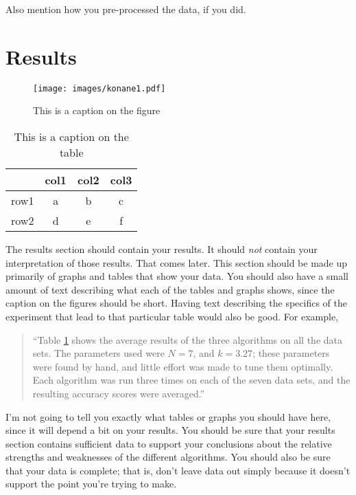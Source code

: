 \documentclass[12pt, letterpaper]{article}
\begin{document}
Also mention how you pre-processed the data, if you did.


\section{Results}
\begin{figure}
\begin{center}
\texttt{[image: images/konane1.pdf]}
\end{center}
\caption{This is a caption on the figure}
\label{somefigure}
\end{figure}

\begin{table}
\begin{center}
\begin{tabular}{|c||c|cc}
\hline
& col1 & col2 & col3\\
\hline \hline
row1 & a & b & c\\
\hline 
row2 & d & e & f\\
\hline 
\end{tabular}
\end{center}
\caption{This is a caption on the table}
\label{sometable}
\end{table}

The results section should contain your results.  It should \emph{not} contain
your interpretation of those results.  That comes later.  This section should be
made up primarily of graphs and tables that show your data.  You should also
have a small amount of text describing what each of the tables and graphs shows,
since the caption on the figures should be short.  Having text describing the
specifics of the experiment that lead to that particular table would also be
good.  For example,

\begin{quote}
``Table \ref{sometable} shows the average results of the three algorithms on all
the data sets.  The parameters used were $N=7$, and $k=3.27$; these parameters
were found by hand, and little effort was made to tune them optimally.  Each
algorithm was run three times on each of the seven data sets, and the resulting
accuracy scores were averaged.''
\end{quote}

I'm not going to tell you exactly what tables or graphs you should have here,
since it will depend a bit on your results.  You should be sure that your
results section contains sufficient data to support your conclusions about the
relative strengths and weaknesses of the different algorithms.  You should also
be sure that your data is complete; that is, don't leave data out simply because
it doesn't support the point you're trying to make.
\end{document}
